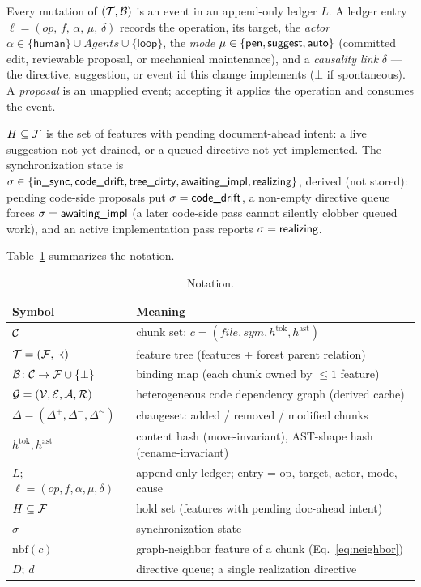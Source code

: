 \begin{definition}
\label{def:ledger}
Every mutation of $(\mathcal{T}, \mathcal{B})$ is an event in an append-only ledger $L$. A ledger
entry $\ell = (\mathit{op},\, f,\, \alpha,\, \mu,\, \delta)$ records the
operation, its target, the \emph{actor}
$\alpha \in \{\textsf{human}\} \cup \mathit{Agents} \cup \{\textsf{loop}\}$,
the \emph{mode} $\mu \in \{\textsf{pen}, \textsf{suggest}, \textsf{auto}\}$ (committed edit, reviewable
proposal, or mechanical maintenance), and a \emph{causality link} $\delta$ ---
the directive, suggestion, or event id this change implements ($\bot$ if
spontaneous). A \emph{proposal} is an unapplied event; accepting it applies the
operation and consumes the event.
\end{definition}

\begin{definition}
\label{def:hold}
$H \subseteq \mathcal{F}$ is the set of features with pending document-ahead intent: a
live suggestion not yet drained, or a queued directive not yet implemented.
The synchronization state is
$\sigma \in \{\textsf{in\_sync}, \textsf{code\_drift}, \textsf{tree\_dirty}, \textsf{awaiting\_impl}, \textsf{realizing}\}$,
derived (not stored): pending code-side proposals put $\sigma = \textsf{code\_drift}$, a
non-empty directive queue forces $\sigma = \textsf{awaiting\_impl}$ (a later code-side pass
cannot silently clobber queued work), and an active implementation pass reports
$\sigma = \textsf{realizing}$.
\end{definition}

Table~\ref{tab:notation} summarizes the notation.

\begin{table}[t]
\centering
\caption{Notation.}
\label{tab:notation}
\small
\begin{tabular}{@{}ll@{}}
\toprule
Symbol & Meaning \\
\midrule
$\mathcal{C}$ & chunk set; $c = (\mathit{file}, \mathit{sym}, h^{\mathrm{tok}}, h^{\mathrm{ast}})$ \\
$\mathcal{T} = (\mathcal{F}, \prec)$ & feature tree (features + forest parent relation) \\
$\mathcal{B} \colon \mathcal{C} \to \mathcal{F} \cup \{\bot\}$ & binding map (each chunk owned by $\leq 1$ feature) \\
$\mathcal{G} = (\mathcal{V}, \mathcal{E}, \mathcal{A}, \mathcal{R})$ & heterogeneous code dependency graph (derived cache) \\
$\Delta = (\Delta^{+}, \Delta^{-}, \Delta^{\sim})$ & changeset: added / removed / modified chunks \\
$h^{\mathrm{tok}}, h^{\mathrm{ast}}$ & content hash (move-invariant), AST-shape hash (rename-invariant) \\
$L$; $\ell = (\mathit{op}, f, \alpha, \mu, \delta)$ & append-only ledger; entry = op, target, actor, mode, cause \\
$H \subseteq \mathcal{F}$ & hold set (features with pending doc-ahead intent) \\
$\sigma$ & synchronization state \\
$\mathrm{nbf}(c)$ & graph-neighbor feature of a chunk (Eq.~\ref{eq:neighbor}) \\
$D$; $d$ & directive queue; a single realization directive \\
\bottomrule
\end{tabular}
\end{table}

